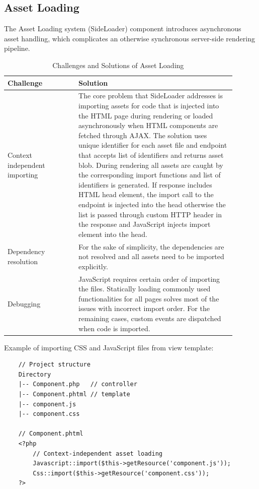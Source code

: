 \subsection{Asset Loading}\label{subsec:asset-loading}
The Asset Loading system (SideLoader) component introduces asynchronous asset handling, which complicates an otherwise synchronous server-side
rendering pipeline.

\begin{table}[H]
    \centering
    \begin{tabular}{|p{0.28\linewidth}|p{0.62\linewidth}|}
        \hline
        \textbf{Challenge} & \textbf{Solution} \\
        \hline
        Context independent importing
        &
        The core problem that SideLoader addresses is importing assets for code that
        is injected into the HTML page during rendering or loaded asynchronously when HTML components are fetched through AJAX\@.
        The solution uses unique identifier for each asset file and endpoint that accepts list of identifiers and returns asset blob.
        During rendering all assets are caught by the corresponding import functions and list of identifiers is generated.
        If response includes HTML head element, the import call to the endpoint is injected into the head otherwise
        the list is passed through custom HTTP header in the response and JavaScript injects import element into the head. \\
        \hline
        Dependency resolution
        &
        For the sake of simplicity, the dependencies are not resolved and all assets need to be imported explicitly. \\
        \hline
        Debugging
        &
        JavaScript requires certain order of importing the files.
        Statically loading commonly used functionalities for all pages solves most of the issues with incorrect import order.
        For the remaining cases, custom events are dispatched when code is imported. \\
        \hline
    \end{tabular}
    \caption{Challenges and Solutions of Asset Loading}
    \label{tab:csSideloader}
\end{table}

Example of importing CSS and JavaScript files from view template:

\begin{verbatim}
    // Project structure
    Directory
    |-- Component.php   // controller
    |-- Component.phtml // template
    |-- component.js
    |-- component.css

    // Component.phtml
    <?php
        // Context-independent asset loading
        Javascript::import($this->getResource('component.js'));
        Css::import($this->getResource('component.css'));
    ?>
\end{verbatim}



